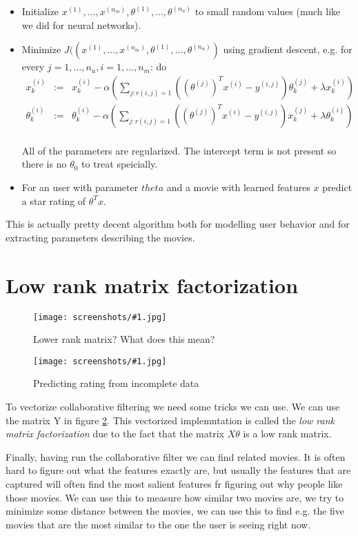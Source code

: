 \documentclass[a4, 12pt, english, USenglish]{scrreprt}
\newcommand{\screenshot}[2]{
\begin{figure}[htb]
\texttt{[image: screenshots/\#1.jpg]}
\label{#1}
\caption{#2}
\end{figure}}
\newcommand{\parens}[1]{\ensuremath{\left({#1}\right)}}
\newcommand{\idx}[1]{{\em #1}\index{#1}}
\begin{document}
\begin{itemize}

\item Initialize \(x^{(1)}, \ldots, x^{(n_m)},\theta^{(1)}, \ldots ,
  \theta^{(n_u)}\) to small random values (much like we did for neural
  networks).

\item Minimize \(J((x^{(1)}, \ldots, x^{(n_m)},\theta^{(1)}, \ldots ,
  \theta^{(n_u)})\) using gradient  descent, e.g. for every \(j=1,
  \ldots, n_u, i = 1, \ldots, n_m\): do 
\[
\begin{array}{lcl}
   x_k^{(i)} &:=&  x_k^{(i)} - \alpha \parens{\sum_{j:r(i,j) = 1} ((\theta^{(j)})^T x^{(i)} - y^{(i,j)})\theta_k^{(j)} + \lambda x_k^{(i)}}\\
   \theta_k^{(i)} &:=&  \theta_k^{(i)} - \alpha \parens{\sum_{j:r(i,j)= 1} ((\theta^{(j)})^T x^{(i)} - y^{(i,j)}) x_k^{(j)} + \lambda \theta_k^{(i)}}\\
\end{array}
\]

All of the parameters are regularized.  The intercept term is not
present so there is no \(\theta_0\) to treat speicially.

\item For an user with parameter \(theta\) and a movie with learned
  features \(x\) predict a star rating of \(\theta^T x\).
\end{itemize}

This is actually  pretty decent algorithm both for modelling user
behavior and for extracting parameters describing the movies.

\section{Low rank matrix factorization}

\screenshot{lowrankmatrix}{Lower rank matrix? What does this mean?}
\screenshot{predictedratings}{Predicting rating from incomplete data}


To vectorize collaborative filtering we need some tricks we can use.
We can use the matrix Y in figure \ref{predictedratings}. This
vectorized implemntation is called the \idx{low rank matrix
  factorization} due to the fact that the matrix \(X\theta\) is a low
rank matrix.

Finally, having run the collaborative filter we can find related
movies.  It is often hard to figure out what the features exactly are,
but usually the features that are captured will often find the most
salient  features fr figuring out why people like those movies.
We can use this to measure how similar two movies are, we try to
minimize some distance between the movies, we can use this to find
e.g. the five movies that are the most similar to the one the user is
seeing right now.
\end{document}
